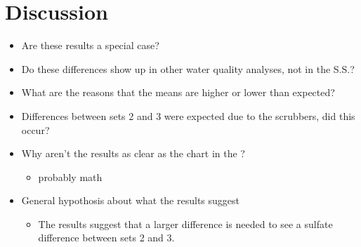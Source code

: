 \section{Discussion}
\begin{itemize}
	\item Are these results a special case?
	\item Do these differences show up in other water quality analyses, not in the S.S.?
	\item What are the reasons that the means are higher or lower than expected?
	\item Differences between sets 2 and 3 were expected due to the scrubbers, did this occur?
	\item Why aren't the results as clear as the chart in the \citep{cai2012}?
	\begin{itemize}
		\item probably math
	\end{itemize}
	\item General hypothosis about what the results suggest
	\begin{itemize}
		\item The results suggest that a larger difference is needed to see a sulfate difference between sets 2 and 3.
	\end{itemize}
\end{itemize}